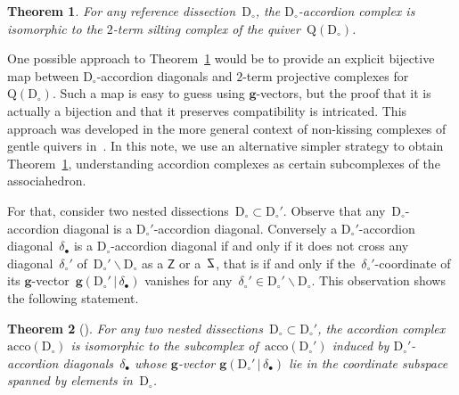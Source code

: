 \documentclass{amsart}
\newtheorem{theorem}{Theorem}%
\theoremstyle{definition}
\renewcommand{\b}[1]{\mathbf{#1}} %
\newcommand{\ssm}{\smallsetminus} %
\newcommand{\acco}{\mathrm{acco}} %
\newcommand{\dissection}{\mathrm{D}} %
\newcommand{\sign}[3]{\varepsilon \big( {#1} \in {#2}\;|\;{#3} \big)} %
\newcommand{\SSS}{\reflectbox{$\mathsf{Z}$}} %
\newcommand{\ZZZ}{\mathsf{Z}} %
\newcommand{\gvector}[2]{\mathbf{g}(#1 \,|\, #2)} %
\newcommand{\quiver}{\mathrm{Q}} %
\begin{document}
\begin{theorem}
\label{thm:bijectionAccordionComplexSiltingComplex}
For any reference dissection~$\dissection_\circ$, the $\dissection_\circ$-accordion complex is isomorphic to the $2$-term silting complex of the quiver~$\quiver(\dissection_\circ)$.
\end{theorem}

One possible approach to Theorem~\ref{thm:bijectionAccordionComplexSiltingComplex} would be to provide an explicit bijective map between $\dissection_\circ$-accordion diagonals and $2$-term projective complexes for~$\quiver(\dissection_\circ)$.
Such a map is easy to guess using $\b{g}$-vectors, but the proof that it is actually a bijection and that it preserves compatibility is intricated.
This approach was developed in the more general context of non-kissing complexes of gentle quivers in~\cite{PaluPilaudPlamondon}.
In this note, we use an alternative simpler strategy to obtain Theorem~\ref{thm:bijectionAccordionComplexSiltingComplex}, understanding accordion complexes as certain subcomplexes of the associahedron.

For that, consider two nested dissections~$\dissection_\circ \subset \dissection_\circ'$.
Observe that any~$\dissection_\circ$-accordion diagonal is a $\dissection_\circ'$-accordion diagonal.
Conversely a $\dissection_\circ'$-accordion diagonal~$\delta_\bullet$ is a $\dissection_\circ$-accordion diagonal if and only if it does not cross any diagonal~$\delta_\circ'$ of~$\dissection_\circ' \ssm \dissection_\circ$ as a $\ZZZ$ or a~$\SSS$, that is if and only if the~$\delta_\circ'$-coordinate of its $\b{g}$-vector~$\gvector{\dissection_\circ'}{\delta_\bullet}$ vanishes for any~$\delta_\circ' \in \dissection_\circ' \ssm \dissection_\circ$.
This observation shows the following statement.

\begin{theorem}[\cite{MannevillePilaud-accordion}]
\label{thm:contractDiagonals}
For any two nested dissections~$\dissection_\circ \subset \dissection_\circ'$, the accordion complex~$\acco(\dissection_\circ)$ is isomorphic to the subcomplex of~$\acco(\dissection_\circ')$ induced by $\dissection_\circ'$-accordion diagonals~$\delta_\bullet$ whose $\b{g}$-vector $\gvector{\dissection_\circ'}{\delta_\bullet}$ lie in the coordinate subspace spanned by elements in~$\dissection_\circ$.
\end{theorem}
\end{document}
